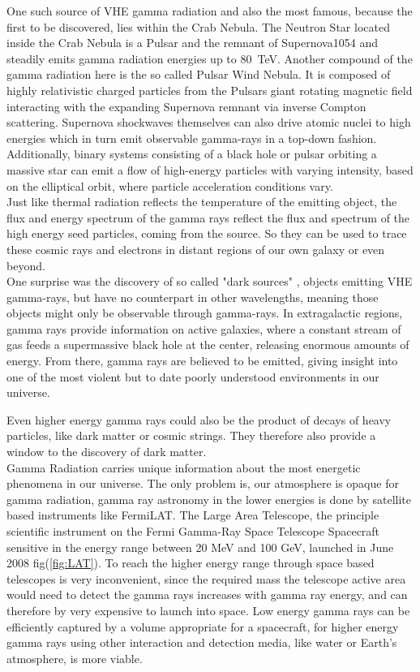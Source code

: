 \documentclass[12pt,article,type=msc,colorback,accentcolor=tud9c]{tudthesis}
\begin{document}
One such source of VHE gamma radiation and also the most famous, because the first to be discovered, lies within the Crab Nebula. The Neutron Star located inside the Crab Nebula is a Pulsar and the remnant of Supernova1054 and steadily emits gamma radiation energies up to 80~TeV. Another compound of the gamma radiation here is the so called Pulsar Wind Nebula. It is composed of highly relativistic charged particles from the Pulsars giant rotating magnetic field interacting with the expanding Supernova remnant via inverse Compton scattering. Supernova shockwaves themselves can also drive atomic nuclei to high energies which in turn emit observable gamma-rays in a top-down fashion. Additionally, binary systems consisting of a black hole or pulsar orbiting a massive star can emit a flow of high-energy particles with varying intensity, based on the elliptical orbit, where particle acceleration conditions vary.\\Just like thermal radiation reflects the temperature of the emitting object, the flux and energy spectrum of the gamma rays reflect the flux and spectrum of the high energy seed particles, coming from the source. So they can be used to trace these cosmic rays and electrons in distant regions of our own galaxy or even beyond. \cite{TeVAstro} \\
One surprise was the discovery of so called "dark sources" , objects emitting VHE gamma-rays, but have no counterpart in other wavelengths, meaning those objects might only be observable through gamma-rays. In extragalactic regions, gamma rays provide information on active galaxies, where a constant stream of gas feeds a supermassive black hole at the center, releasing enormous amounts of energy. From there, gamma rays are believed to be emitted, giving insight into one of the most violent but to date poorly understood environments in our universe. 

Even higher energy gamma rays could also be the product of decays of heavy particles, like dark matter or cosmic strings. They therefore also provide a window to the discovery of dark matter.\\

Gamma Radiation carries unique information about the most energetic phenomena in our universe. 
The only problem is, our atmosphere is opaque for gamma radiation, gamma ray astronomy in the lower energies is done by satellite based instruments like FermiLAT. The Large Area Telescope, the principle scientific instrument on the Fermi Gamma-Ray Space Telescope Spacecraft sensitive in the energy range between 20 MeV and 100 GeV, launched in June 2008 fig(\ref{fig:LAT}). To reach the higher energy range through space based telescopes is very inconvenient, since the required mass the telescope active area would need to detect the gamma rays increases with gamma ray energy, and can therefore by very expensive to launch into space. Low energy gamma rays can be efficiently captured by a volume appropriate for a spacecraft, for higher energy gamma rays using other interaction and detection media, like water or Earth's atmosphere, is more viable.
\end{document}
